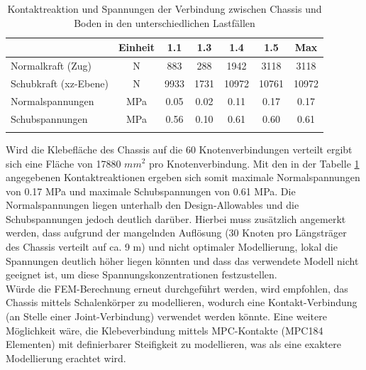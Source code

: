 \begin{table}[H]
\centering
\begin{tabular}{lcccccc}
\thickhline
	&	Einheit	&	1.1	&	1.3	&	1.4	&	1.5	&	Max	\\	\hline
Normalkraft (Zug)	&	N	&	883	&	288	&	1942	&	3118	&	3118	\\
Schubkraft (xz-Ebene)	&	N	&	9933	&	1731	&	10972	&	10761	&	10972	\\	\hline
Normalspannungen	&	MPa	&	0.05	&	0.02	&	0.11	&	0.17	&	0.17	\\
Schubspannungen	&	MPa	&	0.56	&	0.10	&	0.61	&	0.60	&	0.61	\\	\thickhline
\end{tabular}
\caption{Kontaktreaktion und Spannungen der Verbindung zwischen Chassis und Boden in den unterschiedlichen Lastfällen}
\label{tab:FEMres Boden}
\end{table}


Wird die Klebefläche des Chassis auf die 60 Knotenverbindungen verteilt ergibt sich eine Fläche von 17880 $mm^2$ pro Knotenverbindung. Mit den in der Tabelle \ref{tab:FEMres Boden} angegebenen Kontaktreaktionen ergeben sich somit maximale Normalspannungen von 0.17 MPa und maximale Schubspannungen von 0.61 MPa. Die Normalspannungen liegen unterhalb den Design-Allowables und die Schubspannungen jedoch deutlich darüber. Hierbei muss zusätzlich angemerkt werden, dass aufgrund der mangelnden Auflösung (30 Knoten pro Längsträger des Chassis verteilt auf ca. 9 m) und nicht optimaler Modellierung, lokal die Spannungen deutlich höher liegen könnten und dass das verwendete Modell nicht geeignet ist, um diese Spannungskonzentrationen festzustellen.\\
Würde die FEM-Berechnung erneut durchgeführt werden, wird empfohlen, das Chassis mittels Schalenkörper zu modellieren, wodurch eine Kontakt-Verbindung (an Stelle einer Joint-Verbindung) verwendet werden könnte. Eine weitere Möglichkeit wäre, die Klebeverbindung mittels MPC-Kontakte (MPC184 Elementen) mit definierbarer Steifigkeit zu modellieren, was als eine exaktere Modellierung erachtet wird.

